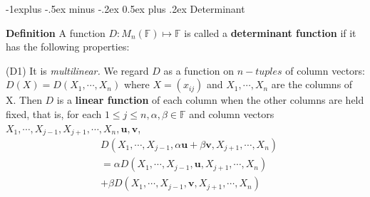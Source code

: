 \documentclass[10pt,landscape]{article}
\makeatletter
\renewcommand{\subsection}{\@startsection{subsection}{2}{0mm}%
                                {-1explus -.5ex minus -.2ex}%
                                {0.5ex plus .2ex}%
                                {\normalfont\normalsize\bfseries}}
\makeatother
\begin{document}
\begin{multicols}{4}



\subsection{Determinant}





\textbf{Definition} A function $D: M_n(\mathbb{F}) \mapsto \mathbb{F}$ is called a \textbf{determinant function} if it has the following properties:

(D1) It is \textit{multilinear.} We regard $D$ as a function on $n-tuples$ of column vectors: $D(X) = D(X_1, \cdots, X_n)$ where $X = (x_{ij})$ and $X_1, \cdots, X_n$ are the columns of X. Then $D$ is a \textbf{linear function} of each column when the other columns are held fixed, that is, for each $1 \leq j \leq n, \alpha, \beta \in \mathbb{F}$ and column vectors $X_1, \cdots, X_{j-1}, X_{j+1}, \cdots, X_n, \mathbf{u}, \mathbf{v}$,
\begin{equation*}
    \begin{aligned}
    &D(X_1, \cdots, X_{j-1}, \alpha \mathbf{u} + \beta \mathbf{v}, X_{j+1}, \cdots, X_n) \\
    &= \alpha D(X_1, \cdots, X_{j-1}, \mathbf{u} , X_{j+1}, \cdots, X_n) \\
    &+ \beta D(X_1, \cdots, X_{j-1}, \mathbf{v} , X_{j+1}, \cdots, X_n)
    \end{aligned}
\end{equation*}


\end{multicols}
\end{document}
